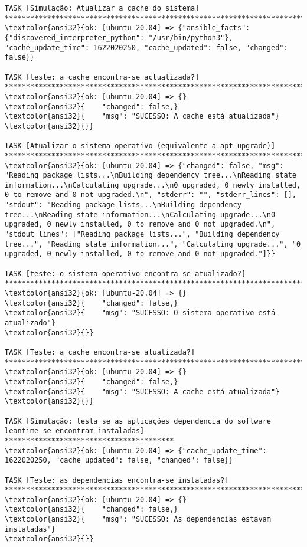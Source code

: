 \documentclass{scrartcl}
\begin{document}
\begin{Verbatim}
TASK [Simulação: Atualizar a cache do sistema] *******************************************************************************************
\textcolor{ansi32}{ok: [ubuntu-20.04] => {"ansible_facts": {"discovered_interpreter_python": "/usr/bin/python3"}, "cache_update_time": 1622020250, "cache_updated": false, "changed": false}}

TASK [teste: a cache encontra-se actualizada?] *******************************************************************************************
\textcolor{ansi32}{ok: [ubuntu-20.04] => {}
\textcolor{ansi32}{    "changed": false,}
\textcolor{ansi32}{    "msg": "SUCESSO: A cache está atualizada"}
\textcolor{ansi32}{}}

TASK [Atualizar o sistema operativo (equivalente a apt upgrade)] *************************************************************************
\textcolor{ansi32}{ok: [ubuntu-20.04] => {"changed": false, "msg": "Reading package lists...\nBuilding dependency tree...\nReading state information...\nCalculating upgrade...\n0 upgraded, 0 newly installed, 0 to remove and 0 not upgraded.\n", "stderr": "", "stderr_lines": [], "stdout": "Reading package lists...\nBuilding dependency tree...\nReading state information...\nCalculating upgrade...\n0 upgraded, 0 newly installed, 0 to remove and 0 not upgraded.\n", "stdout_lines": ["Reading package lists...", "Building dependency tree...", "Reading state information...", "Calculating upgrade...", "0 upgraded, 0 newly installed, 0 to remove and 0 not upgraded."]}}

TASK [teste: o sistema operativo encontra-se atualizado?] ********************************************************************************
\textcolor{ansi32}{ok: [ubuntu-20.04] => {}
\textcolor{ansi32}{    "changed": false,}
\textcolor{ansi32}{    "msg": "SUCESSO: O sistema operativo está atualizado"}
\textcolor{ansi32}{}}

TASK [Teste: a cache encontra-se atualizada?] ********************************************************************************************
\textcolor{ansi32}{ok: [ubuntu-20.04] => {}
\textcolor{ansi32}{    "changed": false,}
\textcolor{ansi32}{    "msg": "SUCESSO: A cache está atualizada"}
\textcolor{ansi32}{}}

TASK [Simulação: testa se as aplicações dependencia do software leantime se encontram instaladas] ****************************************
\textcolor{ansi32}{ok: [ubuntu-20.04] => {"cache_update_time": 1622020250, "cache_updated": false, "changed": false}}

TASK [Teste: as dependencias encontra-se instaladas?] ************************************************************************************
\textcolor{ansi32}{ok: [ubuntu-20.04] => {}
\textcolor{ansi32}{    "changed": false,}
\textcolor{ansi32}{    "msg": "SUCESSO: As dependencias estavam instaladas"}
\textcolor{ansi32}{}}


\end{Verbatim}
\end{document}
